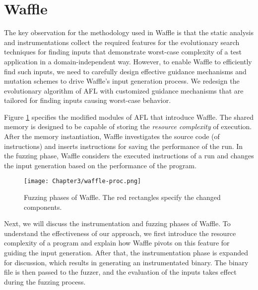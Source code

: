 \section{Waffle}
\label{sec:3-instr}


The key observation for the methodology used in Waffle is that the static analysis and instrumentations collect the required features for the evolutionary search techniques for finding inputs that demonstrate worst-case complexity of a test application in a domain-independent way. However, to enable Waffle to efficiently find such inputs, we need to carefully design effective guidance mechanisms and mutation schemes to drive Waffle's input generation process. We redesign the evolutionary algorithm of AFL with customized guidance mechanisms that are tailored for finding inputs causing worst-case behavior.

Figure \ref{fig:waffle-phases} specifies the modified modules of AFL that introduce Waffle. The shared memory is designed to be capable of storing the \textit{resource complexity} of execution. After the memory instantiation, Waffle investigates the source code (of instructions) and inserts instructions for saving the performance of the run. In the fuzzing phase, Waffle considers the executed instructions of a run and changes the input generation based on the performance of the program.

\begin{figure}[!b]
  \texttt{[image: Chapter3/waffle-proc.png]}
  \centering
  \caption{Fuzzing phases of Waffle. The red rectangles specify the changed components.}
  \label{fig:waffle-phases}
\end{figure}



Next, we will discuss the instrumentation and fuzzing phases of Waffle. To understand the effectiveness of our approach, we first introduce the resource complexity of a program and explain how Waffle pivots on this feature for guiding the input generation. After that, the instrumentation phase is expanded for discussion, which results in generating an instrumentated binary. The binary file is then passed to the fuzzer, and the evaluation of the inputs takes effect during the fuzzing process.

